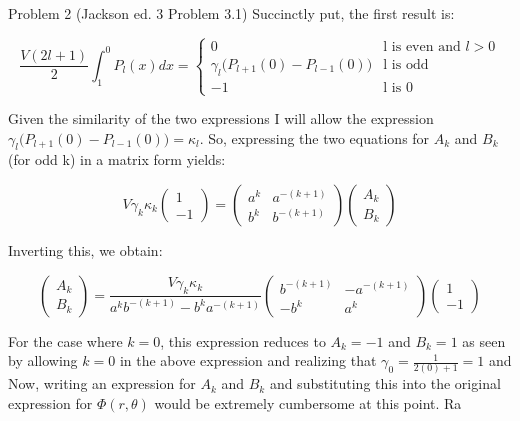 \begin{homeworkProblem}{Problem 2 (Jackson ed. 3 Problem 3.1)}
Succinctly put, the first result is:

\[
\frac{V(2l+1)}{2} \int_{1}^{0} P_l(x) dx = \begin{cases} 0 & \text{l is even and $l > 0$} \\ \gamma_l \big(P_{l+1}(0) - P_{l-1}(0) \big) & \text{l is odd} \\ -1 & \text{l is 0} \end{cases}
\]

Given the similarity of the two expressions I will allow the expression $\gamma_l\big(P_{l+1}(0)-P_{l-1}(0)\big) = \kappa_l$. So, expressing the two equations for $A_{k}$ and $B_{k}$ (for odd k) in a matrix form yields:

\[
V\gamma_k \kappa_k
\begin{pmatrix}
1 \\ -1
\end{pmatrix}
=
\begin{pmatrix}
a^k & a^{-(k+1)} \\
b^k & b^{-(k+1)}
\end{pmatrix}
\begin{pmatrix}
	A_k \\ B_k
\end{pmatrix}
\]

Inverting this, we obtain:

\[
\begin{pmatrix}
	A_k \\ B_k
\end{pmatrix}
=
\frac{V\gamma_k \kappa_k}{a^k b^{-(k+1)} - b^k a^{-(k+1)}}
\begin{pmatrix}
b^{-(k+1)} & -a^{-(k+1)} \\
-b^k & a^k
\end{pmatrix}
\begin{pmatrix}
	1 \\ -1
\end{pmatrix}
\]

For the case where $k = 0$, this expression reduces to $A_k = -1$ and $B_k = 1$ as seen by allowing $k=0$ in the above expression and realizing that $\gamma_0 = \frac{1}{2(0)+1} = 1$ and 
Now, writing an expression for $A_k$ and $B_k$ and substituting this into the original expression for $\Phi(r,\theta)$ would be extremely cumbersome at this point. Ra

\end{homeworkProblem}